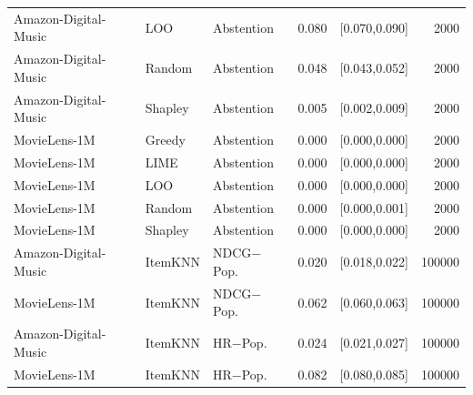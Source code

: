 \begin{table}[t]
\begin{tabular}{@{}lllrrr@{}}
Amazon-Digital-Music & LOO & Abstention & 0.080 & [0.070,0.090] & 2000 \\
Amazon-Digital-Music & Random & Abstention & 0.048 & [0.043,0.052] & 2000 \\
Amazon-Digital-Music & Shapley & Abstention & 0.005 & [0.002,0.009] & 2000 \\
MovieLens-1M & Greedy & Abstention & 0.000 & [0.000,0.000] & 2000 \\
MovieLens-1M & LIME & Abstention & 0.000 & [0.000,0.000] & 2000 \\
MovieLens-1M & LOO & Abstention & 0.000 & [0.000,0.000] & 2000 \\
MovieLens-1M & Random & Abstention & 0.000 & [0.000,0.001] & 2000 \\
MovieLens-1M & Shapley & Abstention & 0.000 & [0.000,0.000] & 2000 \\
Amazon-Digital-Music & ItemKNN & NDCG$-$Pop. & 0.020 & [0.018,0.022] & 100000 \\
MovieLens-1M & ItemKNN & NDCG$-$Pop. & 0.062 & [0.060,0.063] & 100000 \\
Amazon-Digital-Music & ItemKNN & HR$-$Pop. & 0.024 & [0.021,0.027] & 100000 \\
MovieLens-1M & ItemKNN & HR$-$Pop. & 0.082 & [0.080,0.085] & 100000 \\
\bottomrule
\end{tabular}
\end{table}


